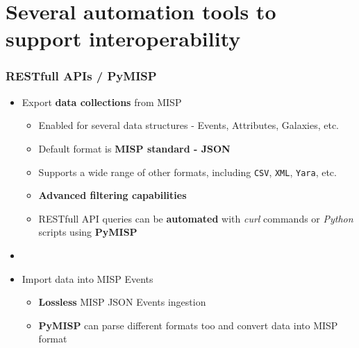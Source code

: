 \section{Several automation tools to \\ support interoperability}

\begin{frame}
    \frametitle{RESTfull APIs / PyMISP}
    \begin{itemize}
        \item Export \textbf{data collections} from MISP
        \begin{itemize}
            \item Enabled for several data structures - Events, Attributes, Galaxies, etc.
            \item Default format is \textbf{MISP standard - JSON}
            \item Supports a wide range of other formats, including \texttt{CSV}, \texttt{XML}, \texttt{Yara}, etc.
            \item \textbf{Advanced filtering capabilities}
            \item RESTfull API queries can be \textbf{automated} with \textit{curl} commands or \textit{Python} scripts using \textbf{PyMISP}
        \end{itemize}
        \item []
        \item Import data into MISP Events
        \begin{itemize}
            \item \textbf{Lossless} MISP JSON Events ingestion
            \item \textbf{PyMISP} can parse different formats too and convert data into MISP format
        \end{itemize}
    \end{itemize}
\end{frame}

